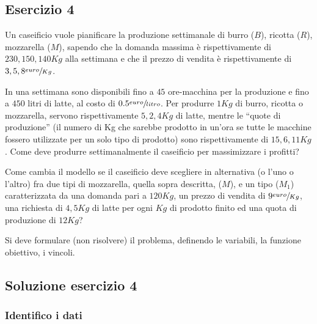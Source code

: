 \documentclass[\main/main.tex]{subfiles}
\begin{document}
\subsection{Esercizio 4}
Un caseificio vuole pianificare la produzione settimanale di burro ($B$), ricotta ($R$), mozzarella ($M$), sapendo che la domanda massima è rispettivamente di $230, 150, 140 Kg$ alla settimana e che il prezzo di vendita è rispettivamente di $3, 5, 8 \sfrac{euro}{Kg}$.

In una settimana sono disponibili fino a $45$ ore-macchina per la produzione e fino a $450$ litri di latte, al costo di $0.5 \sfrac{euro}{litro}$. Per produrre $1 Kg$ di burro, ricotta o mozzarella, servono rispettivamente $5, 2, 4 Kg$ di latte, mentre le “quote di produzione” (il numero di Kg che sarebbe prodotto in un'ora se tutte le macchine fossero utilizzate per un solo tipo di prodotto) sono rispettivamente di $15, 6, 11 Kg$.
Come deve produrre settimanalmente il caseificio per massimizzare i profitti?

Come cambia il modello se il caseificio deve scegliere in alternativa (o l'uno o l'altro) fra due tipi di mozzarella, quella sopra descritta, ($M$), e un tipo ($M_1$) caratterizzata da una domanda pari a $120 Kg$, un prezzo di vendita di $9 \sfrac{euro}{Kg}$, una richiesta di $4,5 Kg$ di latte per ogni $Kg$ di prodotto finito ed una quota di produzione di $12 Kg$?

Si deve formulare (non risolvere) il problema, definendo le variabili, la funzione obiettivo, i vincoli.

\subsection{Soluzione esercizio 4}

\subsubsection*{Identifico i dati}
\end{document}
